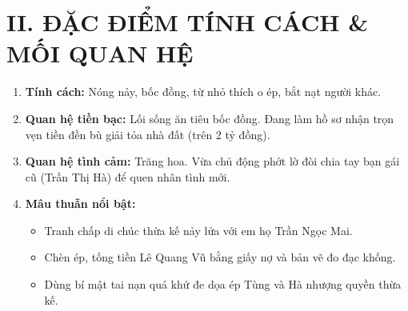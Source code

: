 \documentclass[12pt,a4paper]{article}
\begin{document}
\section*{II. ĐẶC ĐIỂM TÍNH CÁCH \& MỐI QUAN HỆ}
\begin{enumerate}
    \item \textbf{Tính cách:} Nóng nảy, bốc đồng, từ nhỏ thích o ép, bắt nạt người khác.
    \item \textbf{Quan hệ tiền bạc:} Lối sống ăn tiêu bốc đồng. Đang làm hồ sơ nhận trọn vẹn tiền đền bù giải tỏa nhà đất (trên 2 tỷ đồng).
    \item \textbf{Quan hệ tình cảm:} Trăng hoa. Vừa chủ động phớt lờ đòi chia tay bạn gái cũ (Trần Thị Hà) để quen nhân tình mới.
    \item \textbf{Mâu thuẫn nổi bật:}
    \begin{itemize}
        \item Tranh chấp di chúc thừa kế nảy lửa với em họ Trần Ngọc Mai.
        \item Chèn ép, tống tiền Lê Quang Vũ bằng giấy nợ và bản vẽ đo đạc khống.
        \item Dùng bí mật tai nạn quá khứ đe dọa ép Tùng và Hà nhượng quyền thừa kế.
    \end{itemize}
\end{enumerate}
\end{document}
